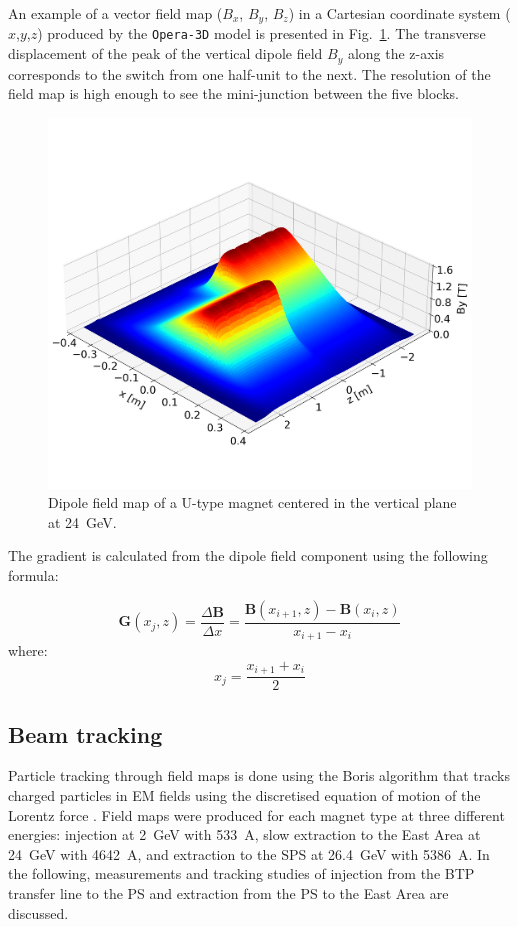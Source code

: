 \documentclass[a4paper,
               biblatex,     %
               keeplastbox,   %
               ]{jacow}
\begin{document}
An example of a vector field map ($B_x$, $B_y$, $B_z$) in a Cartesian coordinate system ($x$,$y$,$z$) produced by the \texttt{Opera-3D} model is presented in Fig.~\ref{fig:dipole_field}. The transverse displacement of the peak of the vertical dipole field $B_{y}$ along the z-axis corresponds to the switch from one half-unit to the next. The resolution of the field map is high enough to see the mini-junction between the five blocks.

\begin{figure}[!htb]
   \centering
   \includegraphics*[width=1.0\columnwidth, trim={0 2.9cm 0 4.3cm},clip]{MOPOTK030_f3.png}
   \caption{Dipole field map of a U-type magnet centered in the vertical plane at \SI{24}{GeV}.}
   \label{fig:dipole_field}
\end{figure}

The gradient is calculated from the dipole field component using the following formula:
 
$$ \boldsymbol{G}(x_{j},z) = \frac{\Delta\boldsymbol{B}}{\Delta x} = \frac{\boldsymbol{B}(x_{i+1},z) - \boldsymbol{B}(x_{i},z)}{x_{i+1}-x_{i}} $$
where:
$$ x_{j} = \frac{x_{i+1} + x_{i}}{{2}} $$

\subsection{Beam tracking}

Particle tracking through field maps is done using the Boris algorithm that tracks charged particles in EM fields using the discretised equation of motion of the Lorentz force \cite{dutheil_pybttrackersborispy_nodate,qin_why_2013,ripperda_comprehensive_2018}. Field maps were produced for each magnet type at three different energies: injection at \SI{2}{GeV} with \SI{533}{A}, slow extraction to the East Area at \SI{24}{GeV} with \SI{4642}{A}, and extraction to the SPS at \SI{26.4}{GeV} with \SI{5386}{A}. In the following, measurements and tracking studies of injection from the BTP transfer line to the PS and extraction from the PS to the East Area are discussed.
\end{document}
